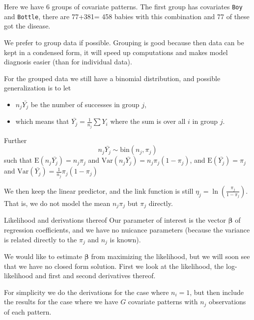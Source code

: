 \documentclass[
  ignorenonframetext,
]{beamer}
\providecommand{\tightlist}{%
  \setlength{\itemsep}{0pt}\setlength{\parskip}{0pt}}
\begin{document}
\begin{frame}[fragile]
Here we have 6 groups of covariate patterns. The first group has
covariates \texttt{Boy} and \texttt{Bottle}, there are 77+381= 458
babies with this combination and 77 of these got the disease.

We prefer to group data if possible. Grouping is good because then data
can be kept in a condensed form, it will speed up computations and makes
model diagnosis easier (than for individual data).
\end{frame}

\begin{frame}
For the grouped data we still have a binomial distribution, and possible
generalization is to let

\begin{itemize}
\tightlist
\item
  \(n_j\bar{Y_j}\) be the number of successes in group \(j\),
\item
  which means that \(\bar{Y_j}=\frac{1}{n_j}\sum Y_i\) where the sum is
  over all \(i\) in group \(j\).
\end{itemize}

Further \[ n_j\bar{Y_j} \sim \text{bin}(n_j,\pi_j)\] such that
\(\text{E}(n_j\bar{Y_j})=n_j \pi_j\) and
\(\text{Var}(n_j\bar{Y_j})=n_j \pi_j(1-\pi_j)\), and
\(\text{E}(\bar{Y_j})=\pi_j\) and
\(\text{Var}(\bar{Y_j})=\frac{1}{n_j} \pi_j(1-\pi_j)\)

We then keep the linear predictor, and the link function is still
\(\eta_j=\ln(\frac{\pi_j}{1-\pi_j})\). That is, we do not model the mean
\(n_j \pi_j\) but \(\pi_j\) directly.
\end{frame}

\begin{frame}{Likelihood and derivations thereof}
\protect\hypertarget{likelihood-and-derivations-thereof}{}
Our parameter of interest is the vector \(\boldsymbol{\beta}\) of
regression coefficients, and we have no nuicance parameters (because the
variance is related directly to the \(\pi_j\) and \(n_j\) is known).

We would like to estimate \(\boldsymbol{\beta}\) from maximizing the
likelihood, but we will soon see that we have no closed form solution.
First we look at the likelihood, the log-likelihood and first and second
derivatives thereof.

For simplicity we do the derivations for the case where \(n_i=1\), but
then include the results for the case where we have \(G\) covariate
patterns with \(n_j\) observations of each pattern.
\end{frame}
\end{document}
